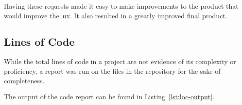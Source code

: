 Having these requests made it easy to make improvements to the product that would improve the~\gls{ux}.
It also resulted in a greatly improved final product.

\subsection{Lines of Code}\label{subsec:lines-of-code}

While the total lines of code in a project are not evidence of its complexity or proficiency,
a report was run on the files in the repository for the sake of completeness.

The output of the code report can be found in Listing~\ref{lst:loc-output}.

